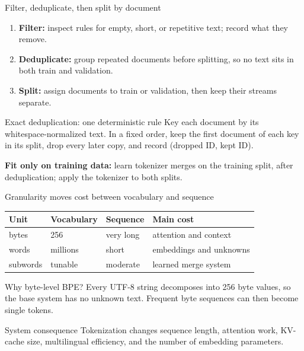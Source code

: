 \documentclass[handout]{beamer}
\begin{document}
\begin{frame}{Filter, deduplicate, then split by document}
  \small
  \begin{enumerate}
      \setlength{\itemsep}{3pt}
    \item \textbf{Filter:} inspect rules for empty, short, or repetitive text; record what they remove.
    \item \textbf{Deduplicate:} group repeated documents before splitting, so no text sits in both train and validation.
    \item \textbf{Split:} assign documents to train or validation, then keep their streams separate.
  \end{enumerate}
  \begin{block}{Exact deduplication: one deterministic rule}
    Key each document by its whitespace-normalized text. In a fixed order, keep the first document of each key in its split, drop every later copy, and record (dropped ID, kept ID).
  \end{block}
  \textbf{Fit only on training data:} learn tokenizer merges on the training split, after deduplication; apply the tokenizer to both splits.
\end{frame}

\begin{frame}{Granularity moves cost between vocabulary and sequence}
  \small
  \begin{tabular}{llll}
    \toprule
    Unit & Vocabulary & Sequence & Main cost \\
    \midrule
    bytes & 256 & very long & attention and context \\
    words & millions & short & embeddings and unknowns \\
    subwords & tunable & moderate & learned merge system \\
    \bottomrule
  \end{tabular}
  \vfill
  \begin{block}{Why byte-level BPE?}
    Every UTF-8 string decomposes into 256 byte values, so the base system has no unknown text. Frequent byte sequences can then become single tokens.
  \end{block}
  \begin{alertblock}{System consequence}
    Tokenization changes sequence length, attention work, KV-cache size, multilingual efficiency, and the number of embedding parameters.
  \end{alertblock}
\end{frame}
\end{document}
